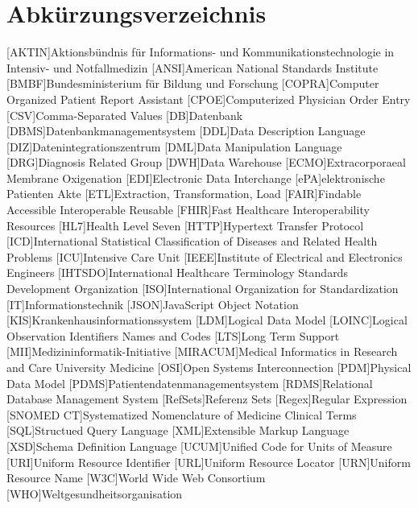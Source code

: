 \chapter*{Abkürzungsverzeichnis}

\begin{acronym}[ABK]
	[AKTIN]{Aktionsbündnis für Informations- und Kommunikationstechnologie in Intensiv- und Notfallmedizin}
	[ANSI]{American National Standards Institute}
	[BMBF]{Bundesministerium für Bildung und Forschung}
	[COPRA]{Computer Organized Patient Report Assistant}
	[CPOE]{Computerized Physician Order Entry}
	[CSV]{Comma-Separated Values}
	[DB]{Datenbank}
	[DBMS]{Datenbankmanagementsystem}
	[DDL]{Data Description Language}
	[DIZ]{Datenintegrationszentrum}
	[DML]{Data Manipulation Language}
	[DRG]{Diagnosis Related Group}
	[DWH]{Data Warehouse}
	[ECMO]{Extracorporaeal Membrane Oxigenation}
	[EDI]{Electronic Data Interchange}
	[ePA]{elektronische Patienten Akte}
	[ETL]{Extraction, Transformation, Load}
	[FAIR]{Findable Accessible Interoperable Reusable}
	[FHIR]{Fast Healthcare Interoperability Resources}
	[HL7]{Health Level Seven}
	[HTTP]{Hypertext Transfer Protocol}
	[ICD]{International Statistical Classification of Diseases and Related Health Problems}
	[ICU]{Intensive Care Unit}
	[IEEE]{Institute of Electrical and Electronics Engineers}
	[IHTSDO]{International Healthcare Terminology Standards Development Organization}
	[ISO]{International Organization for Standardization}
	[IT]{Informationstechnik}
	[JSON]{JavaScript Object Notation}
	[KIS]{Krankenhausinformationssystem}
	[LDM]{Logical Data Model}
	[LOINC]{Logical Observation Identifiers Names and Codes}
	[LTS]{Long Term Support}
	[MII]{Medizininformatik-Initiative}
	[MIRACUM]{Medical Informatics in Research and Care University Medicine}
	[OSI]{Open Systems Interconnection}
	[PDM]{Physical Data Model}
	[PDMS]{Patientendatenmanagementsystem}
	[RDMS]{Relational Database Management System}
	[RefSets]{Referenz Sets}
	[Regex]{Regular Expression}
	[SNOMED CT]{Systematized Nomenclature of Medicine Clinical Terms}
	[SQL]{Structued Query Language}
	[XML]{Extensible Markup Language}
	[XSD]{Schema Definition Language}
	[UCUM]{Unified Code for Units of Measure}
	[URI]{Uniform Resource Identifier}
	[URL]{Uniform Resource Locator}
	[URN]{Uniform Resource Name}
	[W3C]{World Wide Web Consortium}
	[WHO]{Weltgesundheitsorganisation}

\end{acronym}

